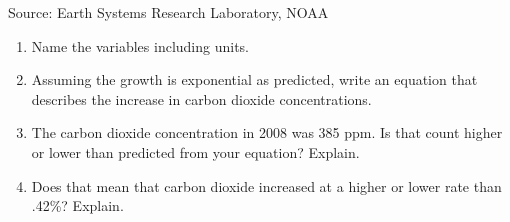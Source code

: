 \begin{enumerate}
 \hfill \begin{footnotesize} Source: Earth Systems Research Laboratory, NOAA \end{footnotesize}
\begin{enumerate}
\item Name the variables including units.     \vfill
\item Assuming the growth is exponential as predicted, write an equation that describes the increase in carbon dioxide concentrations.   \vfill
\item The carbon dioxide concentration in 2008 was 385 ppm. Is that count higher or lower than predicted from your equation?  Explain.   \vfill
\item Does that mean that carbon dioxide increased at a higher or lower rate than .42\%?  Explain.   \vfill
\end{enumerate}

\end{enumerate}
